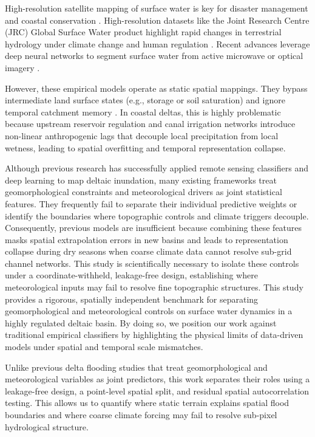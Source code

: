 High-resolution satellite mapping of surface water is key for disaster management and coastal conservation \citep{Wu2020Ensemble}. High-resolution datasets like the Joint Research Centre (JRC) Global Surface Water product highlight rapid changes in terrestrial hydrology under climate change and human regulation \citep{Pekel2016Highresolution}. Recent advances leverage deep neural networks to segment surface water from active microwave or optical imagery \citep{Bazi2021Vision, Phan2020Land}. 

However, these empirical models operate as static spatial mappings. They bypass intermediate land surface states (e.g., storage or soil saturation) and ignore temporal catchment memory \citep{Nearing2020What}. In coastal deltas, this is highly problematic because upstream reservoir regulation and canal irrigation networks introduce non-linear anthropogenic lags that decouple local precipitation from local wetness, leading to spatial overfitting and temporal representation collapse.

Although previous research has successfully applied remote sensing classifiers and deep learning to map deltaic inundation, many existing frameworks treat geomorphological constraints and meteorological drivers as joint statistical features. They frequently fail to separate their individual predictive weights or identify the boundaries where topographic controls and climate triggers decouple. Consequently, previous models are insufficient because combining these features masks spatial extrapolation errors in new basins and leads to representation collapse during dry seasons when coarse climate data cannot resolve sub-grid channel networks. This study is scientifically necessary to isolate these controls under a coordinate-withheld, leakage-free design, establishing where meteorological inputs may fail to resolve fine topographic structures. This study provides a rigorous, spatially independent benchmark for separating geomorphological and meteorological controls on surface water dynamics in a highly regulated deltaic basin. By doing so, we position our work against traditional empirical classifiers by highlighting the physical limits of data-driven models under spatial and temporal scale mismatches.

Unlike previous delta flooding studies that treat geomorphological and meteorological variables as joint predictors, this work separates their roles using a leakage-free design, a point-level spatial split, and residual spatial autocorrelation testing. This allows us to quantify where static terrain explains spatial flood boundaries and where coarse climate forcing may fail to resolve sub-pixel hydrological structure.

